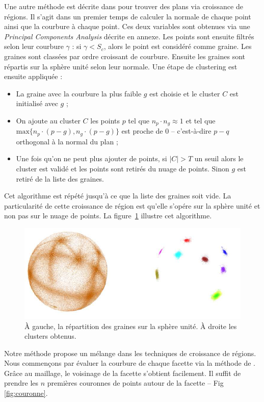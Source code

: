 ﻿\documentclass[12pt, twoside]{article}
\begin{document}
Une autre méthode est décrite dans \cite{reggrow3} pour trouver des plans via croissance de régions. Il s'agit dans un premier temps de calculer la normale de chaque point ainsi que la courbure à chaque point. Ces deux variables sont obtenues via une \textit{Principal Components Analysis} décrite en annexe. Les points sont ensuite filtrés selon leur courbure $\gamma$ : si $\gamma < S_c$, alors le point est considéré comme graine. Les graines sont classées par ordre croissant de courbure. Ensuite les graines sont répartis sur la sphère unité selon leur normale. Une étape de clustering est ensuite appliquée :
\begin{itemize}
  \item La graine avec la courbure la plus faible $g$ est choisie et le cluster $C$ est initialisé avec $g$ ;
  \item On ajoute au cluster $C$ les points $p$ tel que $n_p\cdot n_g \approx 1$ et tel que $\text{max}\{n_p\cdot(p-g), n_g\cdot(p-g)\}$ est proche de 0 -- c'est-à-dire $p-q$ orthogonal à la normal du plan ;
  \item Une fois qu'on ne peut plus ajouter de points, si $\vert C\vert > T$ un seuil alors le cluster est validé et les points sont retirés du nuage de points. Sinon $g$ est retiré de la liste des graines.
\end{itemize}
Cet algorithme est répété jusqu'à ce que la liste des graines soit vide. La particularité de cette croissance de région est qu'elle s'opére sur la sphère unité et non pas sur le nuage de points. La figure~\ref{fig:GaussMap} illustre cet algorithme.

\begin{figure}[h]
\centering
\includegraphics[scale=0.65]{GaussMap.png}
\caption{\label{fig:GaussMap} À gauche, la répartition des graines sur la sphère unité. À droite les clusters obtenus.}
\end{figure}

Notre méthode propose un mélange dans les techniques de croissance de régions. Nous commençons par évaluer la courbure de chaque facette via la méthode de \cite{reggrow3}. Grâce au maillage, le voisinage de la facette s'obtient facilement. Il suffit de prendre les $n$ premières couronnes de points autour de la facette -- Fig \ref{fig:couronne}.
\end{document}
